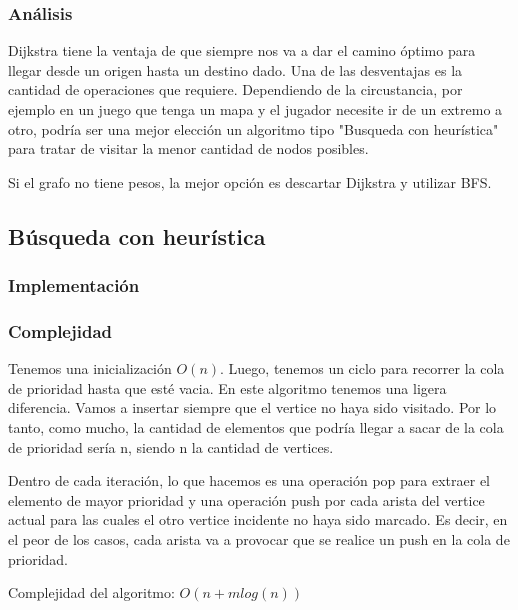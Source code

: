 \subsubsection{Análisis}
Dijkstra tiene la ventaja de que siempre nos va a dar el camino óptimo para llegar desde un origen hasta un destino dado. Una de las desventajas es la cantidad de operaciones que requiere. Dependiendo de la circustancia, por ejemplo en un juego que tenga un mapa y el jugador necesite ir de un extremo a otro, podría ser una mejor elección un algoritmo tipo "Busqueda con heurística" para tratar de visitar la menor cantidad de nodos posibles.

Si el grafo no tiene pesos, la mejor opción es descartar Dijkstra y utilizar BFS.

\newpage

\subsection{Búsqueda con heurística}
\subsubsection{Implementación}

\subsubsection{Complejidad}

Tenemos una inicialización $O(n)$. Luego, tenemos un ciclo para recorrer la cola de prioridad hasta que esté vacia. En este algoritmo tenemos una ligera diferencia. Vamos a insertar siempre que el vertice no haya sido visitado. Por lo tanto, como mucho, la cantidad de elementos que podría llegar a sacar de la cola de prioridad sería n, siendo n la cantidad de vertices.

Dentro de cada iteración, lo que hacemos es una operación pop para extraer el elemento de mayor prioridad y una operación push por cada arista del vertice actual para las cuales el otro vertice incidente no haya sido marcado. Es decir, en el peor de los casos, cada arista va a provocar que se realice un push en la cola de prioridad.

Complejidad del algoritmo: $O(n + mlog(n))$
